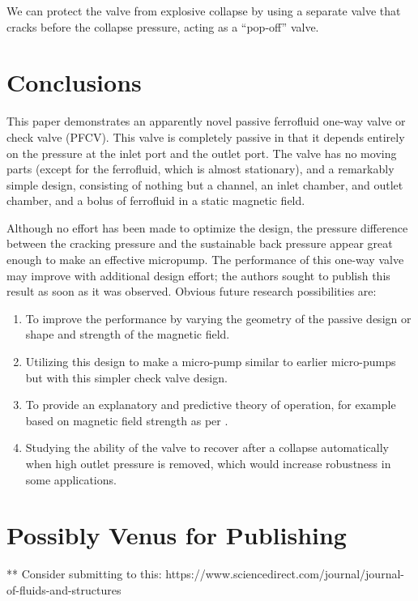 \documentclass{asme2ej}
\begin{document}
We can protect the valve from explosive collapse by using a separate
valve that cracks before the collapse pressure, acting as a ``pop-off''
valve.





\section{Conclusions}

This paper demonstrates an apparently novel passive ferrofluid one-way
valve or check valve (PFCV). This valve is completely passive in that
it depends entirely on the pressure at the inlet port and the outlet
port. The valve has no moving parts (except for the ferrofluid, which
is almost stationary), and a remarkably simple design, consisting of
nothing but a channel, an inlet chamber, and outlet chamber,
and a bolus of ferrofluid in a
static magnetic field.

Although no effort has been made to optimize the design, the pressure
difference between the cracking pressure and the sustainable back
pressure appear great enough to make an effective micropump. The
performance of this one-way valve may improve with additional design
effort; the authors sought to publish this result as soon as it was
observed.  Obvious future research possibilities are:
\begin{enumerate}
\item  To improve the
performance by varying the geometry of the passive design or shape and
strength of the magnetic field.
\item Utilizing this design to make a micro-pump
similar to earlier micro-pumps but with this simpler check valve
design.
\item To provide an explanatory and predictive theory of operation,
for example based on magnetic field strength as per \cite{ando2009ferrofluidic}.
\item Studying the ability of the valve to recover after
  a collapse automatically when high outlet pressure is removed,
  which would increase robustness in some applications.
\end{enumerate}

\section{Possibly Venus for Publishing}


** Consider submitting to this: https://www.sciencedirect.com/journal/journal-of-fluids-and-structures
\end{document}
